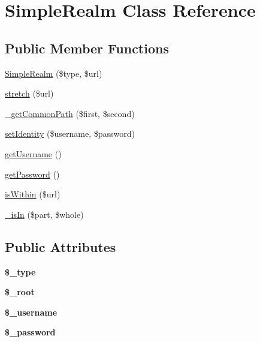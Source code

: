 \hypertarget{class_simple_realm}{
\section{SimpleRealm Class Reference}
\label{class_simple_realm}
}
\subsection*{Public Member Functions}
\begin{DoxyCompactItemize}
\item 
\hyperlink{class_simple_realm_a697001a75f6b1c5e54c8427ede4cbe37}{SimpleRealm} (\$type, \$url)
\item 
\hyperlink{class_simple_realm_a9337bb639d1bf37b5dee82ca86ab5a8e}{stretch} (\$url)
\item 
\hyperlink{class_simple_realm_aaa3d4109ef5eaa54f04d8e3c213ce88f}{\_\-getCommonPath} (\$first, \$second)
\item 
\hyperlink{class_simple_realm_aeddea8991cfb570150e5f42499da6819}{setIdentity} (\$username, \$password)
\item 
\hyperlink{class_simple_realm_a7493447585e5c5bccbcc4207ec117e81}{getUsername} ()
\item 
\hyperlink{class_simple_realm_a983a28e44171457f617582d877b94ea8}{getPassword} ()
\item 
\hyperlink{class_simple_realm_a64076eacf3613b1f68b43b5e5d404391}{isWithin} (\$url)
\item 
\hyperlink{class_simple_realm_a31fe2a65a1da7590b51f9139f8195ab7}{\_\-isIn} (\$part, \$whole)
\end{DoxyCompactItemize}
\subsection*{Public Attributes}
\begin{DoxyCompactItemize}
\item 
\hypertarget{class_simple_realm_ae11c731eff9050624ce1b106c7b81353}{
{\bfseries \$\_\-type}}
\label{class_simple_realm_ae11c731eff9050624ce1b106c7b81353}

\item 
\hypertarget{class_simple_realm_af179ff006a54114d639e57ad6f1e14fb}{
{\bfseries \$\_\-root}}
\label{class_simple_realm_af179ff006a54114d639e57ad6f1e14fb}

\item 
\hypertarget{class_simple_realm_aa1e537175e8c670a370d80085831109c}{
{\bfseries \$\_\-username}}
\label{class_simple_realm_aa1e537175e8c670a370d80085831109c}

\item 
\hypertarget{class_simple_realm_a56eb0662552e5eb4eee2290a7fa77088}{
{\bfseries \$\_\-password}}
\label{class_simple_realm_a56eb0662552e5eb4eee2290a7fa77088}

\end{DoxyCompactItemize}


